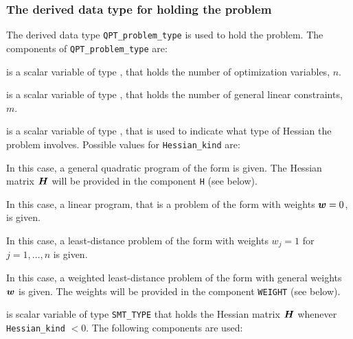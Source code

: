 \documentclass{galahad}
\begin{document}

\subsubsection{The derived data type for holding the problem}\label{typeprob}
The derived data type {\tt QPT\_problem\_type} is used to hold
the problem. The components of
{\tt QPT\_problem\_type}
are:

\begin{description}

 is a scalar variable of type \integer,
 that holds the number of optimization variables, $n$.

 is a scalar variable of type \integer,
 that holds the number of general linear constraints, $m$.

 is a scalar variable of type \integer,
that is used to indicate what type of Hessian the problem involves.
Possible values for {\tt Hessian\_kind} are:

\begin{description}
  In this case, a general quadratic program of the form
 is given. The Hessian matrix ${\bm{H}}$ will be provided in the
component {\tt H} (see below).

  In this case, a linear program, that is a problem of the form
 with weights ${\bm{w}} = 0$, is given.

 In this case, a least-distance problem of the form 
with weights $w_{j} = 1$ for $j = 1, \ldots , n$ is given.

 In this case, a weighted least-distance problem of the form 
with general weights ${\bm{w}}$ is given. The weights will be
provided in the component {\tt WEIGHT} (see below).
\end{description}

 is scalar variable of type {\tt SMT\_TYPE}
that holds the Hessian matrix ${\bm{H}}$ whenever {\tt Hessian\_kind} $<0$.
The following components are used:

\begin{description}


\end{description}
\end{description}
\end{document}
